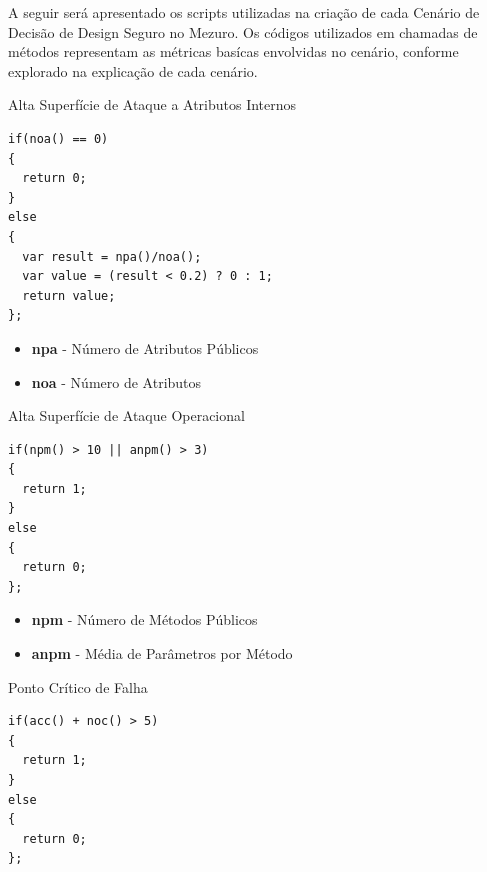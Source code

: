 A seguir será apresentado os scripts utilizadas na criação de cada Cenário de Decisão de Design Seguro no Mezuro. Os códigos utilizados em chamadas de métodos representam as métricas basícas envolvidas no cenário, conforme explorado na explicação de cada cenário.

\begin{description}
	\item[Alta Superfície de Ataque a Atributos Internos]
\end{description}

\begin{lstlisting}[caption={\emph{Script} do Cenário \emph{High Surface Attack to Internal Attributes}}, label=hsaia]
if(noa() == 0) 
{
  return 0;
}
else
{
  var result = npa()/noa();
  var value = (result < 0.2) ? 0 : 1; 
  return value;
};
\end{lstlisting}

\begin{itemize}
	\item \textbf{npa} - Número de Atributos Públicos
	\item \textbf{noa} - Número de Atributos
\end{itemize}

\begin{description}
	\item[Alta Superfície de Ataque Operacional]
\end{description}

\begin{lstlisting}[caption={\emph{Script} do Cenário \emph{High Surface Operational Attack}}, label=hsoa]
if(npm() > 10 || anpm() > 3)
{
  return 1;
}
else
{
  return 0;
};
\end{lstlisting}

\begin{itemize}
	\item \textbf{npm} - Número de Métodos Públicos
	\item \textbf{anpm} - Média de Parâmetros por Método
\end{itemize}

\begin{description}
	\item[Ponto Crítico de Falha]
\end{description}

\begin{lstlisting}[caption={\emph{Script} do Cenário \emph{Critical Point of Failure}}, label=cpf]
if(acc() + noc() > 5)
{
  return 1;
}
else
{
  return 0;
};
\end{lstlisting}

